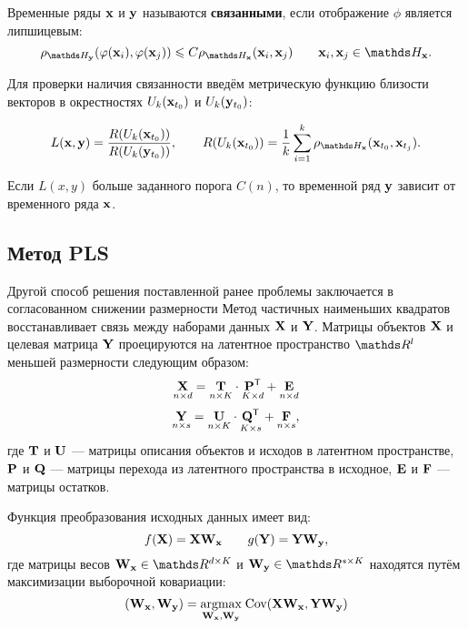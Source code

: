 \documentclass[a4paper, 12pt]{article}
\begin{document}
\begin{definition}
	Временные ряды $\mathbf{x}$ и $\mathbf{y}$ называются \textbf{связанными}, если отображение $\phi$ является липшицевым:
	$$ \rho_{\dH_{\by}}(\phi(\bx_i), \phi(\bx_j)) \leq C \rho_{\dH_{\bx}}(\bx_i, \bx_j) \qquad \bx_i, \bx_j \in \dH_{\bx}. $$
\end{definition}

Для проверки наличия связанности введём метрическую функцию близости векторов в окрестностях $U_k(\mathbf{x}_{t_0})$ и $U_k(\mathbf{y}_{t_0})$:

\begin{equation}
	L(\bx, \by) = \dfrac{R(U_k(\bx_{t_0}))}{R(U_k(\by_{t_0}))}, \qquad R(U_k(\bx_{t_0})) = \dfrac{1}{k} \sum\limits_{i=1}^k \rho_{\dH_{\bx}}(\bx_{t_0}, \bx_{t_j}).
\end{equation}

Если $L(x, y)$ больше заданного порога $C(n)$, то временной ряд $\mathbf{y}$ зависит от временного ряда $\mathbf{x}$.

\subsection{Метод PLS}
Другой способ решения поставленной ранее проблемы заключается в согласованном снижении размерности
Метод частичных наименьших квадратов восстанавливает связь между наборами данных $\mathbf{X}$ и $\mathbf{Y}$. 
Матрицы объектов $\mathbf{X}$ и целевая матрица $\mathbf{Y}$ проецируются на латентное пространство $\dR^l$ меньшей размерности следующим образом:
$$ \underset{n \times d}{\mathbf{X}} = \underset{n \times K}{\mathbf{T}} \cdot \underset{K \times d}{\mathbf{P}^{\mathsf{T}}} + \underset{n \times d}{\mathbf{E}} $$
$$ \underset{n \times s}{\mathbf{Y}} = \underset{n \times K}{\mathbf{U}} \cdot \underset{K \times s}{\mathbf{Q}^{\mathsf{T}}} + \underset{n \times s}{\mathbf{F}}, $$
где $\mathbf{T}$ и $\mathbf{U}$ --- матрицы описания объектов и исходов в латентном пространстве, $\mathbf{P}$ и $\mathbf{Q}$ --- матрицы перехода из латентного пространства в исходное, $\mathbf{E}$ и $\mathbf{F}$ --- матрицы остатков.

Функция преобразования исходных данных имеет вид: 
$$ f(\mathbf{X}) = \mathbf{X}\mathbf{W}_{\mathbf{x}} \qquad g(\mathbf{Y}) = \mathbf{Y}\mathbf{W}_{\mathbf{y}}, $$ 
где матрицы весов $\bW_{\bx} \in \dR^{d \times K}$ и $\bW_{\by} \in \dR^{s \times K}$ находятся путём максимизации выборочной ковариации:
$$ (\mathbf{W}_{\mathbf{x}}, \mathbf{W}_{\mathbf{y}}) = \underset{\mathbf{W}_{\mathbf{x}}, \mathbf{W}_{\mathbf{y}}}{\text{argmax}}\; \text{Cov}(\mathbf{X}\mathbf{W}_{\mathbf{x}}, \mathbf{Y}\mathbf{W}_{\mathbf{y}})$$
\end{document}

